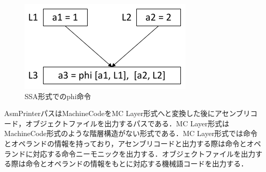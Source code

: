 \begin{figure}
    \centering
    \includegraphics[scale=1.0]{image/phi_function.pdf}
    \caption{SSA形式でのphi命令}
    \label{fig:phi_func}
\end{figure}

AsmPrinterパスはMachineCodeをMC Layer形式へと変換した後にアセンブリコード，オブジェクトファイルを出力するパスである．MC Layer形式はMachineCode形式のような階層構造がない形式である．MC Layer形式では命令とオペランドの情報を持っており，アセンブリコードと出力する際は命令とオペランドに対応する命令ニーモニックを出力する．オブジェクトファイルを出力する際は命令とオペランドの情報をもとに対応する機械語コードを出力する．

